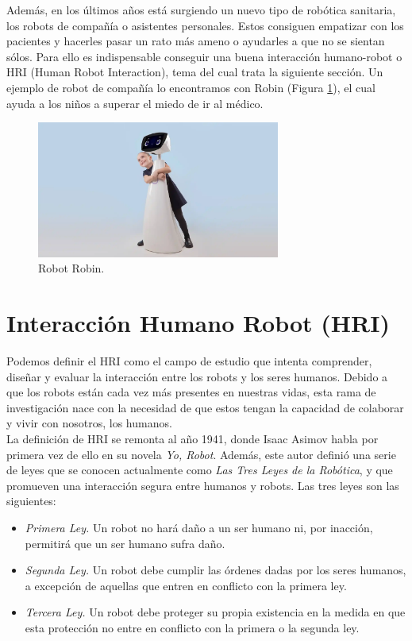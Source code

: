 \begin{itemize}
Además, en los últimos años está surgiendo un nuevo tipo de robótica sanitaria, los robots de compañía o asistentes personales. Estos consiguen empatizar con los pacientes y hacerles pasar un rato más ameno o ayudarles a que no se sientan sólos. Para ello es indispensable conseguir una buena interacción humano-robot o HRI (Human Robot Interaction), tema del cual trata la siguiente sección. Un ejemplo de robot de compañía lo encontramos con Robin (Figura \ref{fig:robin}), el cual ayuda a los niños a superar el miedo de ir al médico.

\begin{figure} [h!]
  \begin{center}
    \includegraphics[width=8cm]{figs/robin.png}
  \end{center}
  \caption{Robot Robin.}
  \label{fig:robin}
\end{figure}
\end{itemize}

\section{Interacción Humano Robot (HRI)}
\label{sec:interaccion_humano_robot}

Podemos definir el HRI como el campo de estudio que intenta comprender, diseñar y evaluar la interacción entre los robots y los seres humanos. Debido a que los robots están cada vez más presentes en nuestras vidas, esta rama de investigación nace con la necesidad de que estos tengan la capacidad de colaborar y vivir con nosotros, los humanos.\\

La definición de HRI se remonta al año 1941, donde Isaac Asimov habla por primera vez de ello en su novela \textit{Yo, Robot}. Además, este autor definió una serie de leyes que se conocen actualmente como \textit{Las Tres Leyes de la Robótica}, y que promueven una interacción segura entre humanos y robots. Las tres leyes son las siguientes:

\begin{itemize}
    \item \textit{Primera Ley.} Un robot no hará daño a un ser humano ni, por inacción, permitirá que un ser humano sufra daño.
    \item \textit{Segunda Ley.} Un robot debe cumplir las órdenes dadas por los seres humanos, a excepción de aquellas que entren en conflicto con la primera ley.
    \item \textit{Tercera Ley.} Un robot debe proteger su propia existencia en la medida en que esta protección no entre en conflicto con la primera o la segunda ley.
\end{itemize}

